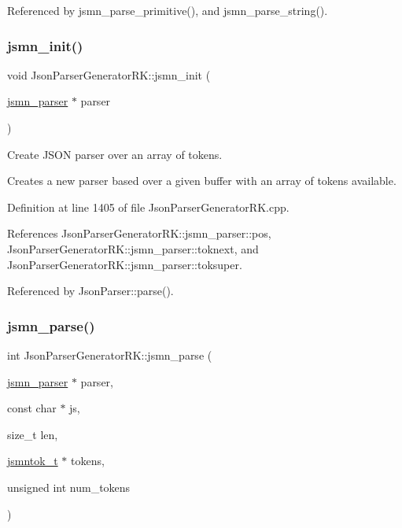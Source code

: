 Referenced by jsmn\+\_\+parse\+\_\+primitive(), and jsmn\+\_\+parse\+\_\+string().

\mbox{\label{namespace_json_parser_generator_r_k_adb1f5ae92d1df7b0b95f5caefbe0d55b}} 
\subsubsection{\texorpdfstring{jsmn\+\_\+init()}{jsmn\_init()}}
{\footnotesize\ttfamily void Json\+Parser\+Generator\+R\+K\+::jsmn\+\_\+init (\begin{DoxyParamCaption}\item[{\hyperlink{struct_json_parser_generator_r_k_1_1jsmn__parser}{jsmn\+\_\+parser} $\ast$}]{parser }\end{DoxyParamCaption})}



Create J\+S\+ON parser over an array of tokens. 

Creates a new parser based over a given buffer with an array of tokens available. 

Definition at line 1405 of file Json\+Parser\+Generator\+R\+K.\+cpp.



References Json\+Parser\+Generator\+R\+K\+::jsmn\+\_\+parser\+::pos, Json\+Parser\+Generator\+R\+K\+::jsmn\+\_\+parser\+::toknext, and Json\+Parser\+Generator\+R\+K\+::jsmn\+\_\+parser\+::toksuper.



Referenced by Json\+Parser\+::parse().

\mbox{\label{namespace_json_parser_generator_r_k_acb71a39877526380a034824e99e59b75}} 
\subsubsection{\texorpdfstring{jsmn\+\_\+parse()}{jsmn\_parse()}}
{\footnotesize\ttfamily int Json\+Parser\+Generator\+R\+K\+::jsmn\+\_\+parse (\begin{DoxyParamCaption}\item[{\hyperlink{struct_json_parser_generator_r_k_1_1jsmn__parser}{jsmn\+\_\+parser} $\ast$}]{parser,  }\item[{const char $\ast$}]{js,  }\item[{size\+\_\+t}]{len,  }\item[{\hyperlink{struct_json_parser_generator_r_k_1_1jsmntok__t}{jsmntok\+\_\+t} $\ast$}]{tokens,  }\item[{unsigned int}]{num\+\_\+tokens }\end{DoxyParamCaption})}



